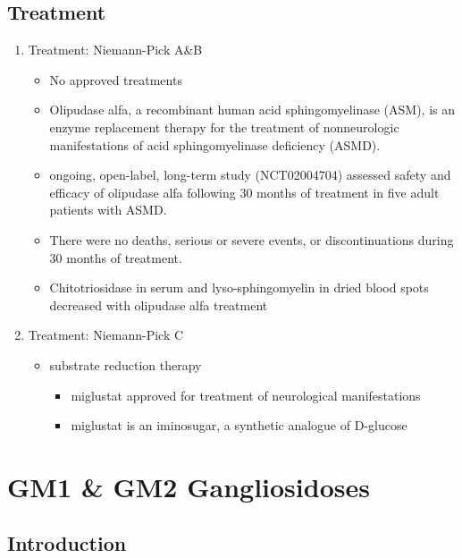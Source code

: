 \documentclass{scrartcl}
\begin{document}
\subsection{Treatment}
\label{sec:orge5f4f36}
\begin{enumerate}
\item Treatment: Niemann-Pick A\&B
\label{sec:org74dd8cc}
\begin{itemize}
\item No approved treatments
\item Olipudase alfa, a recombinant human acid sphingomyelinase (ASM), is
an enzyme replacement therapy for the treatment of nonneurologic
manifestations of acid sphingomyelinase deficiency (ASMD).
\item ongoing, open-label, long-term study (NCT02004704) assessed safety
and efficacy of olipudase alfa following 30 months of treatment in
five adult patients with ASMD.
\item There were no deaths, serious or severe events, or discontinuations
during 30 months of treatment.
\item Chitotriosidase in serum and lyso-sphingomyelin in dried blood spots
decreased with olipudase alfa treatment
\end{itemize}

\item Treatment: Niemann-Pick C
\label{sec:orgdb47ca5}
\begin{itemize}
\item substrate reduction therapy
\begin{itemize}
\item miglustat approved for treatment of neurological manifestations
\item miglustat is an iminosugar, a synthetic analogue of D-glucose
\end{itemize}
\end{itemize}
\end{enumerate}

\section{GM1 \& GM2 Gangliosidoses}
\label{sec:org3f9e80b}
\subsection{Introduction}
\label{sec:org21f6991}
\end{document}
